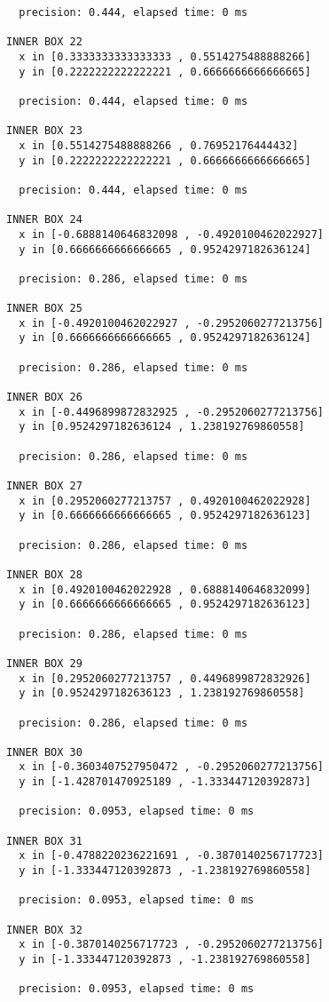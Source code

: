 \begin{verbatim}
  precision: 0.444, elapsed time: 0 ms

INNER BOX 22
  x in [0.3333333333333333 , 0.5514275488888266]
  y in [0.2222222222222221 , 0.6666666666666665]

  precision: 0.444, elapsed time: 0 ms

INNER BOX 23
  x in [0.5514275488888266 , 0.76952176444432]
  y in [0.2222222222222221 , 0.6666666666666665]

  precision: 0.444, elapsed time: 0 ms

INNER BOX 24
  x in [-0.6888140646832098 , -0.4920100462022927]
  y in [0.6666666666666665 , 0.9524297182636124]

  precision: 0.286, elapsed time: 0 ms

INNER BOX 25
  x in [-0.4920100462022927 , -0.2952060277213756]
  y in [0.6666666666666665 , 0.9524297182636124]

  precision: 0.286, elapsed time: 0 ms

INNER BOX 26
  x in [-0.4496899872832925 , -0.2952060277213756]
  y in [0.9524297182636124 , 1.238192769860558]

  precision: 0.286, elapsed time: 0 ms

INNER BOX 27
  x in [0.2952060277213757 , 0.4920100462022928]
  y in [0.6666666666666665 , 0.9524297182636123]

  precision: 0.286, elapsed time: 0 ms

INNER BOX 28
  x in [0.4920100462022928 , 0.6888140646832099]
  y in [0.6666666666666665 , 0.9524297182636123]

  precision: 0.286, elapsed time: 0 ms

INNER BOX 29
  x in [0.2952060277213757 , 0.4496899872832926]
  y in [0.9524297182636123 , 1.238192769860558]

  precision: 0.286, elapsed time: 0 ms

INNER BOX 30
  x in [-0.3603407527950472 , -0.2952060277213756]
  y in [-1.428701470925189 , -1.333447120392873]

  precision: 0.0953, elapsed time: 0 ms

INNER BOX 31
  x in [-0.4788220236221691 , -0.3870140256717723]
  y in [-1.333447120392873 , -1.238192769860558]

  precision: 0.0953, elapsed time: 0 ms

INNER BOX 32
  x in [-0.3870140256717723 , -0.2952060277213756]
  y in [-1.333447120392873 , -1.238192769860558]

  precision: 0.0953, elapsed time: 0 ms


\end{verbatim}
